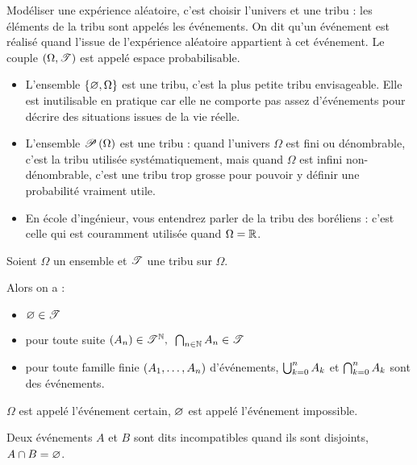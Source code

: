 Modéliser une expérience aléatoire, c'est choisir l'univers et une tribu : les éléments de la tribu sont appelés les événements. On dit qu'un événement est réalisé quand l'issue de l'expérience aléatoire appartient à cet événement. Le couple \(\groupe{\Omega}[\fami{T}]\) est appelé espace probabilisable.

\begin{ex}
\begin{itemize}
    \item L'ensemble \(\accol{\ensvide,\Omega}\) est une tribu, c'est la plus petite tribu envisageable. Elle est inutilisable en pratique car elle ne comporte pas assez d'événements pour décrire des situations issues de la vie réelle. \\
    \item L'ensemble \(\P{\Omega}\) est une tribu : quand l'univers \(\Omega\) est fini ou dénombrable, c'est la tribu utilisée systématiquement, mais quand \(\Omega\) est infini non-dénombrable, c'est une tribu trop grosse pour pouvoir y définir une probabilité vraiment utile. \\
    \item En école d'ingénieur, vous entendrez parler de la tribu des boréliens : c'est celle qui est couramment utilisée quand \(\Omega=\R\).
\end{itemize}
\end{ex}

\begin{prop}
Soient \(\Omega\) un ensemble et \(\fami{T}\) une tribu sur \(\Omega\).

Alors on a :

\begin{itemize}
    \item \(\ensvide\in\fami{T}\) \\
    \item pour toute suite \(\quantifs{\paren{A_n}\in\fami{T}^\N}\biginter_{n\in\N}A_n\in\fami{T}\) \\
    \item pour toute famille finie \(\paren{A_1,\dots,A_n}\) d'événements, \(\bigunion_{k=0}^nA_k\) et \(\biginter_{k=0}^nA_k\) sont des événements.
\end{itemize}
\end{prop}

\begin{defi}
\(\Omega\) est appelé l'événement certain, \(\ensvide\) est appelé l'événement impossible.

Deux événements \(A\) et \(B\) sont dits incompatibles quand ils sont disjoints, \ie \(A\inter B=\ensvide\).
\end{defi}

